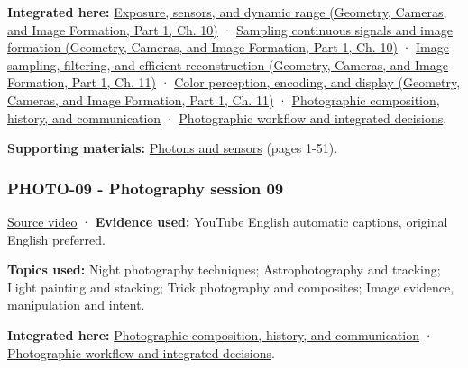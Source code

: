 \textbf{Integrated here:} \href{../03-Geometry-Cameras-and-Image-Formation-P01/main.pdf\#nameddest=03-visual-computing-i-ch003-exposure-sensors-and-dynamic-range}{Exposure, sensors, and dynamic range (Geometry, Cameras, and Image Formation, Part 1, Ch. 10)} · \href{../03-Geometry-Cameras-and-Image-Formation-P01/main.pdf\#nameddest=03-visual-computing-i-ch003-sampling-continuous-signals-and-image-formation}{Sampling continuous signals and image formation (Geometry, Cameras, and Image Formation, Part 1, Ch. 10)} · \href{../03-Geometry-Cameras-and-Image-Formation-P01/main.pdf\#nameddest=03-visual-computing-i-ch004-image-sampling-filtering-and-efficient-reconstruction}{Image sampling, filtering, and efficient reconstruction (Geometry, Cameras, and Image Formation, Part 1, Ch. 11)} · \href{../03-Geometry-Cameras-and-Image-Formation-P01/main.pdf\#nameddest=03-visual-computing-i-ch004-color-perception-encoding-and-display}{Color perception, encoding, and display (Geometry, Cameras, and Image Formation, Part 1, Ch. 11)} · \hyperref[04-visual-computing-ii-ch034-photographic-composition-history-and-communication]{Photographic composition, history, and communication} · \hyperref[04-visual-computing-ii-ch034-photographic-workflow-and-integrated-decisions]{Photographic workflow and integrated decisions}.

\textbf{Supporting materials:} \href{https://drive.google.com/open?id=0B6w2XfPHEcZYell0Tkt2YjkwYWc}{Photons and sensors} (pages 1-51).

\subsubsection{PHOTO-09 - Photography session 09}\label{04-visual-computing-ii-ch036-photo-09---photography-session-09}

\hypertarget{04-visual-computing-ii-ch036-photo-09---photography-session-09}{}

\href{https://www.youtube.com/watch?v=1ah8EEqfFsM}{Source video} · \textbf{Evidence used:} YouTube English automatic captions, original English preferred.

\textbf{Topics used:} Night photography techniques; Astrophotography and tracking; Light painting and stacking; Trick photography and composites; Image evidence, manipulation and intent.

\textbf{Integrated here:} \hyperref[04-visual-computing-ii-ch034-photographic-composition-history-and-communication]{Photographic composition, history, and communication} · \hyperref[04-visual-computing-ii-ch034-photographic-workflow-and-integrated-decisions]{Photographic workflow and integrated decisions}.

